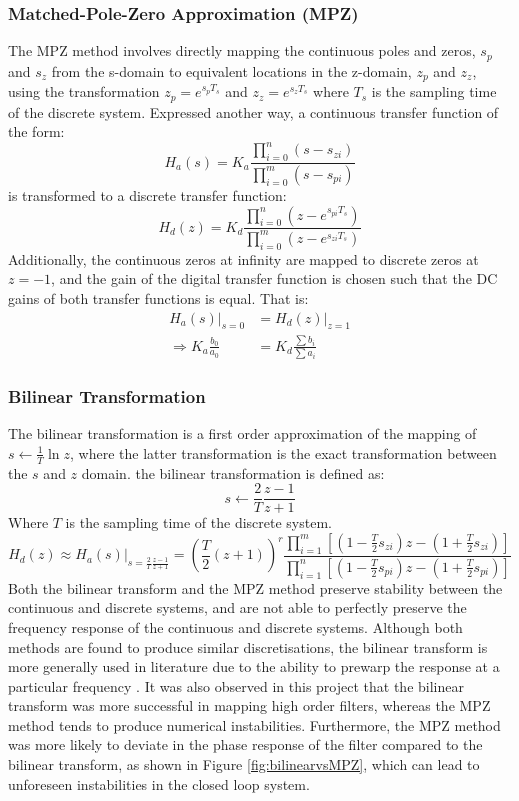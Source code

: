 \subsubsection{Matched-Pole-Zero Approximation (MPZ)}
The MPZ method involves directly mapping the continuous poles and zeros, $s_p$ and $s_z$ from the s-domain to equivalent locations in the z-domain, $z_p$ and $z_z$, using the transformation $z_p = e^{s_pT_s}$ and $z_z = e^{s_zT_s}$ where $T_s$ is the sampling time of the discrete system. Expressed another way, a continuous transfer function of the form:
\begin{equation}
H_a(s) = K_a\frac{\prod\limits_{i=0}^{n}(s-s_{zi})}{\prod\limits_{i=0}^{m}(s-s_{pi})}
\end{equation}
is transformed to a discrete transfer function:
\begin{equation}H_d(z) = K_d\frac{\prod\limits_{i=0}^{n}(z-e^{s_{pi}T_s})}{\prod\limits_{i=0}^{m}(z-e^{s_{zi}T_s})}\end{equation}
Additionally, the continuous zeros at infinity are mapped to discrete zeros at $z=-1$, and the gain of the digital transfer function is chosen such that the DC gains of both transfer functions is equal. That is:
\begin{align}
    H_a(s)|_{s=0} &= H_d(z)|_{z=1}\\
    \Rightarrow K_a\frac{b_0}{a_0} &= K_d\frac{\sum b_i}{\sum a_i}
\end{align}
\subsubsection{Bilinear Transformation}
The bilinear transformation is a first order approximation of the mapping of $s \leftarrow \frac{1}{T}\ln{z}$, where the latter transformation is the exact transformation between the $s$ and $z$ domain. the bilinear transformation is defined as:
$$s \leftarrow \frac{2}{T}\frac{z-1}{z+1}$$
Where $T$ is the sampling time of the discrete system. 
\begin{equation}
    H_d(z) \approx H_a(s)|_{s=\frac{2}{T}\frac{z-1}{z+1}} =\left(\frac{T}{2}(z+1)\right)^r\frac{\prod\limits_{i=1}^{m}[(1-\frac{T}{2}s_{zi})z - (1+\frac{T}{2}s_{zi})]}{\prod\limits_{i=1}^{n}[(1-\frac{T}{2}s_{pi})z - (1+\frac{T}{2}s_{pi})]}
\end{equation}
Both the bilinear transform and the MPZ method preserve stability between the continuous and discrete systems, and are not able to perfectly preserve the frequency response of the continuous and discrete systems. Although both methods are found to produce similar discretisations, the bilinear transform is more generally used in literature due to the ability to prewarp the response at a particular frequency \cite{jackson2013digital}. It was also observed in this project that the bilinear transform was more successful in mapping high order filters, whereas the MPZ method tends to produce numerical instabilities. Furthermore, the MPZ method was more likely to deviate in the phase response of the filter compared to the bilinear transform, as shown in Figure \ref{fig:bilinearvsMPZ}, which can lead to unforeseen instabilities in the closed loop system.

